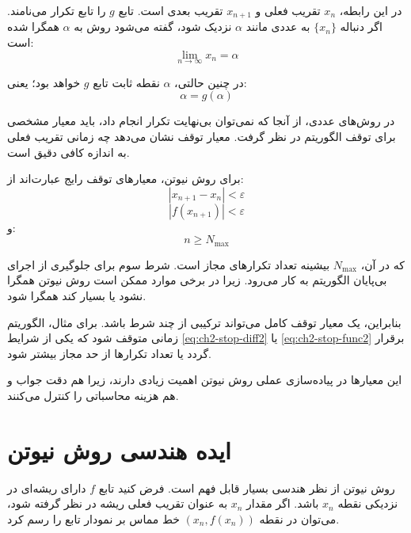در این رابطه، $x_n$ تقریب فعلی و $x_{n+1}$ تقریب بعدی است. تابع $g$ را تابع تکرار می‌نامند. اگر دنباله $\{x_n\}$ به عددی مانند $\alpha$ نزدیک شود، گفته می‌شود روش به $\alpha$ همگرا شده است:
\begin{equation}
\lim_{n\to\infty} x_n = \alpha
\label{eq:ch2-convergence}
\end{equation}

در چنین حالتی، $\alpha$ نقطه ثابت تابع $g$ خواهد بود؛ یعنی:
\begin{equation}
\alpha = g(\alpha)
\label{eq:ch2-fixedpoint}
\end{equation}

در روش‌های عددی، از آنجا که نمی‌توان بی‌نهایت تکرار انجام داد، باید معیار مشخصی برای توقف الگوریتم در نظر گرفت. معیار توقف نشان می‌دهد چه زمانی تقریب فعلی به اندازه کافی دقیق است.

برای روش نیوتن، معیارهای توقف رایج عبارت‌اند از:
\begin{equation}
|x_{n+1}-x_n|<\varepsilon
\label{eq:ch2-stop-diff2}
\end{equation}
\begin{equation}
|f(x_{n+1})|<\varepsilon
\label{eq:ch2-stop-func2}
\end{equation}
و:
\begin{equation}
n \geq N_{\max}
\label{eq:ch2-stop-maxiter}
\end{equation}

که در آن، $N_{\max}$ بیشینه تعداد تکرارهای مجاز است. شرط سوم برای جلوگیری از اجرای بی‌پایان الگوریتم به کار می‌رود. زیرا در برخی موارد ممکن است روش نیوتن همگرا نشود یا بسیار کند همگرا شود.

بنابراین، یک معیار توقف کامل می‌تواند ترکیبی از چند شرط باشد. برای مثال، الگوریتم زمانی متوقف شود که یکی از شرایط \eqref{eq:ch2-stop-diff2} یا \eqref{eq:ch2-stop-func2} برقرار گردد یا تعداد تکرارها از حد مجاز بیشتر شود.

این معیارها در پیاده‌سازی عملی روش نیوتن اهمیت زیادی دارند، زیرا هم دقت جواب و هم هزینه محاسباتی را کنترل می‌کنند.

\section{ایده هندسی روش نیوتن}

روش نیوتن از نظر هندسی بسیار قابل فهم است. فرض کنید تابع $f$ دارای ریشه‌ای در نزدیکی نقطه $x_n$ باشد. اگر مقدار $x_n$ به عنوان تقریب فعلی ریشه در نظر گرفته شود، می‌توان در نقطه $(x_n,f(x_n))$ خط مماس بر نمودار تابع را رسم کرد.

